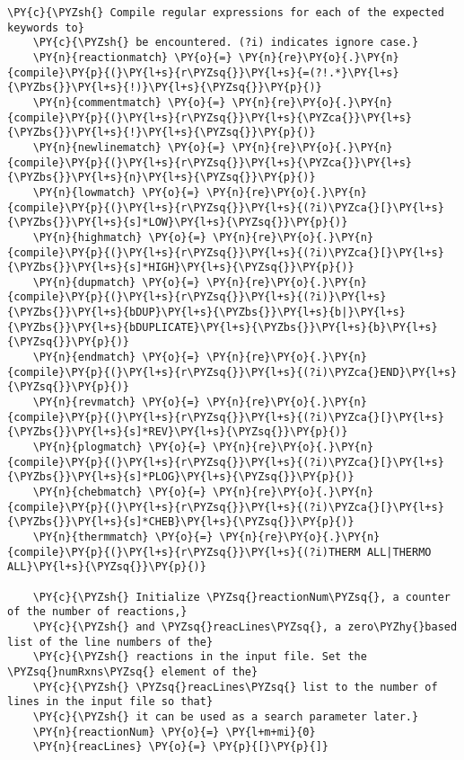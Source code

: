 \begin{Verbatim}[commandchars=\\\{\}]
    \PY{c}{\PYZsh{} Compile regular expressions for each of the expected keywords to}
    \PY{c}{\PYZsh{} be encountered. (?i) indicates ignore case.}
    \PY{n}{reactionmatch} \PY{o}{=} \PY{n}{re}\PY{o}{.}\PY{n}{compile}\PY{p}{(}\PY{l+s}{r\PYZsq{}}\PY{l+s}{=(?!.*}\PY{l+s}{\PYZbs{}}\PY{l+s}{!)}\PY{l+s}{\PYZsq{}}\PY{p}{)}
    \PY{n}{commentmatch} \PY{o}{=} \PY{n}{re}\PY{o}{.}\PY{n}{compile}\PY{p}{(}\PY{l+s}{r\PYZsq{}}\PY{l+s}{\PYZca{}}\PY{l+s}{\PYZbs{}}\PY{l+s}{!}\PY{l+s}{\PYZsq{}}\PY{p}{)}
    \PY{n}{newlinematch} \PY{o}{=} \PY{n}{re}\PY{o}{.}\PY{n}{compile}\PY{p}{(}\PY{l+s}{r\PYZsq{}}\PY{l+s}{\PYZca{}}\PY{l+s}{\PYZbs{}}\PY{l+s}{n}\PY{l+s}{\PYZsq{}}\PY{p}{)}
    \PY{n}{lowmatch} \PY{o}{=} \PY{n}{re}\PY{o}{.}\PY{n}{compile}\PY{p}{(}\PY{l+s}{r\PYZsq{}}\PY{l+s}{(?i)\PYZca{}[}\PY{l+s}{\PYZbs{}}\PY{l+s}{s]*LOW}\PY{l+s}{\PYZsq{}}\PY{p}{)}
    \PY{n}{highmatch} \PY{o}{=} \PY{n}{re}\PY{o}{.}\PY{n}{compile}\PY{p}{(}\PY{l+s}{r\PYZsq{}}\PY{l+s}{(?i)\PYZca{}[}\PY{l+s}{\PYZbs{}}\PY{l+s}{s]*HIGH}\PY{l+s}{\PYZsq{}}\PY{p}{)}
    \PY{n}{dupmatch} \PY{o}{=} \PY{n}{re}\PY{o}{.}\PY{n}{compile}\PY{p}{(}\PY{l+s}{r\PYZsq{}}\PY{l+s}{(?i)}\PY{l+s}{\PYZbs{}}\PY{l+s}{bDUP}\PY{l+s}{\PYZbs{}}\PY{l+s}{b|}\PY{l+s}{\PYZbs{}}\PY{l+s}{bDUPLICATE}\PY{l+s}{\PYZbs{}}\PY{l+s}{b}\PY{l+s}{\PYZsq{}}\PY{p}{)}
    \PY{n}{endmatch} \PY{o}{=} \PY{n}{re}\PY{o}{.}\PY{n}{compile}\PY{p}{(}\PY{l+s}{r\PYZsq{}}\PY{l+s}{(?i)\PYZca{}END}\PY{l+s}{\PYZsq{}}\PY{p}{)}
    \PY{n}{revmatch} \PY{o}{=} \PY{n}{re}\PY{o}{.}\PY{n}{compile}\PY{p}{(}\PY{l+s}{r\PYZsq{}}\PY{l+s}{(?i)\PYZca{}[}\PY{l+s}{\PYZbs{}}\PY{l+s}{s]*REV}\PY{l+s}{\PYZsq{}}\PY{p}{)}
    \PY{n}{plogmatch} \PY{o}{=} \PY{n}{re}\PY{o}{.}\PY{n}{compile}\PY{p}{(}\PY{l+s}{r\PYZsq{}}\PY{l+s}{(?i)\PYZca{}[}\PY{l+s}{\PYZbs{}}\PY{l+s}{s]*PLOG}\PY{l+s}{\PYZsq{}}\PY{p}{)}
    \PY{n}{chebmatch} \PY{o}{=} \PY{n}{re}\PY{o}{.}\PY{n}{compile}\PY{p}{(}\PY{l+s}{r\PYZsq{}}\PY{l+s}{(?i)\PYZca{}[}\PY{l+s}{\PYZbs{}}\PY{l+s}{s]*CHEB}\PY{l+s}{\PYZsq{}}\PY{p}{)}
    \PY{n}{thermmatch} \PY{o}{=} \PY{n}{re}\PY{o}{.}\PY{n}{compile}\PY{p}{(}\PY{l+s}{r\PYZsq{}}\PY{l+s}{(?i)THERM ALL|THERMO ALL}\PY{l+s}{\PYZsq{}}\PY{p}{)}

    \PY{c}{\PYZsh{} Initialize \PYZsq{}reactionNum\PYZsq{}, a counter of the number of reactions,}
    \PY{c}{\PYZsh{} and \PYZsq{}reacLines\PYZsq{}, a zero\PYZhy{}based list of the line numbers of the}
    \PY{c}{\PYZsh{} reactions in the input file. Set the \PYZsq{}numRxns\PYZsq{} element of the}
    \PY{c}{\PYZsh{} \PYZsq{}reacLines\PYZsq{} list to the number of lines in the input file so that}
    \PY{c}{\PYZsh{} it can be used as a search parameter later.}
    \PY{n}{reactionNum} \PY{o}{=} \PY{l+m+mi}{0}
    \PY{n}{reacLines} \PY{o}{=} \PY{p}{[}\PY{p}{]}


\end{Verbatim}
